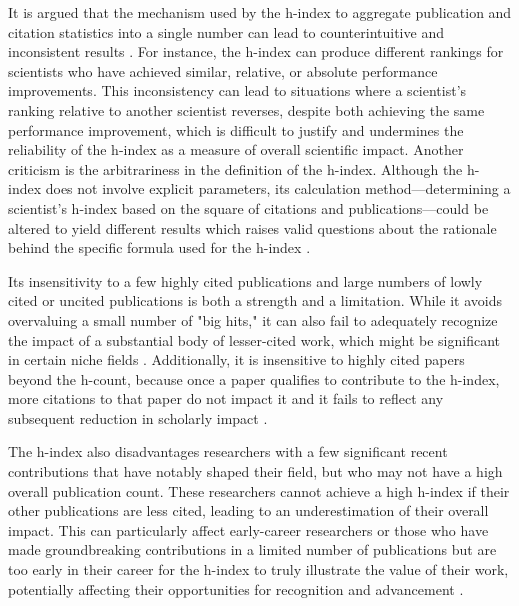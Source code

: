 It is argued that the mechanism used by the h-index to aggregate publication
and citation statistics into a single number can lead to counterintuitive and
inconsistent results \cite{waltman2012inconsistency}. For instance, the h-index
can produce different rankings for scientists who have achieved similar,
relative, or absolute performance improvements. This inconsistency can lead to
situations where a scientist’s ranking relative to another scientist reverses,
despite both achieving the same performance improvement, which is difficult to
justify and undermines the reliability of the h-index as a measure of overall
scientific impact. Another criticism is the arbitrariness in the definition of
the h-index. Although the h-index does not involve explicit parameters, its
calculation method—determining a scientist's h-index based on the square of
citations and publications—could be altered to yield different results which
raises valid questions about the rationale behind the specific formula used for
the h-index \cite{waltman2012inconsistency}.

Its insensitivity to a few highly cited publications and large numbers of lowly
cited or uncited publications is both a strength and a limitation. While it
avoids overvaluing a small number of "big hits," it can also fail to adequately
recognize the impact of a substantial body of lesser-cited work, which might be
significant in certain niche fields
\cite{hirsch2005index,costas2007h,waltman2012inconsistency,norris2010h,egghe2010hirsch}.
Additionally, it is insensitive to highly cited papers beyond the h-count,
because once a paper qualifies to contribute to the h-index, more citations to
that paper do not impact it and it fails to reflect any subsequent reduction in
scholarly impact
\cite{hirsch2005index,bornmann2007what,waltman2012inconsistency,norris2010h,egghe2010hirsch,hirsch2014meaning}.

The h-index also disadvantages researchers with a few significant recent
contributions that have notably shaped their field, but who may not have a high
overall publication count. These researchers cannot achieve a high h-index if
their other publications are less cited, leading to an underestimation of their
overall impact. This can particularly affect early-career researchers or those
who have made groundbreaking contributions in a limited number of publications
but are too early in their career for the h-index to truly illustrate the value
of their work, potentially affecting their opportunities for recognition and
advancement
\cite{hirsch2005index,bornmann2007what,costas2007h,waltman2012inconsistency,norris2010h,egghe2010hirsch,hirsch2014meaning}.

